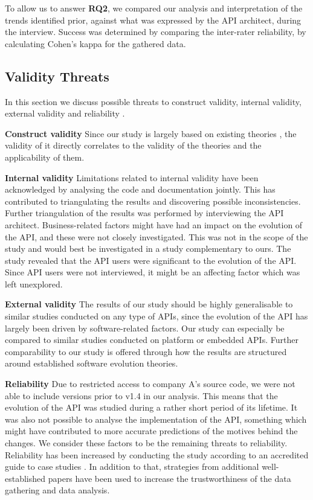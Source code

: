 \documentclass{sig-alternate}
\begin{document}
To allow us to answer \textbf{RQ2}, we compared our analysis and interpretation of the trends identified prior, against what was expressed by the API architect, during the interview. Success was determined by comparing the inter-rater reliability, by calculating Cohen's kappa \cite{cohen1968weighted} for the gathered data. 





\subsection{Validity Threats} \label{validity_threats} 
In this section we discuss possible threats to construct validity, internal validity, external validity and reliability \cite{runeson2009guidelines}.

\smallskip \noindent
\textbf{Construct validity  } Since our study is largely based on existing theories \cite{chapin2001types, lehman90sview}, the validity of it directly correlates to the validity of the theories and the applicability of them. 

\smallskip \noindent
\textbf{Internal validity  } Limitations related to internal validity have been acknowledged by analysing the code and documentation jointly. This has contributed to triangulating the results and discovering possible inconsistencies. Further triangulation of the results was performed by interviewing the API architect. Business-related factors might have had an impact on the evolution of the API, and these were not closely investigated. This was not in the scope of the study and would best be investigated in a study complementary to ours. The study revealed that the API users were significant to the evolution of the API. Since API users were not interviewed, it might be an affecting factor which was left unexplored. 

\smallskip \noindent
\textbf{External validity  } The results of our study should be highly generalisable to similar studies conducted on any type of APIs, since the evolution of the API has largely been driven by software-related factors. Our study can especially be compared to similar studies conducted on platform or embedded APIs. Further comparability to our study is offered through how the results are structured around established software evolution theories. 

\smallskip \noindent
\textbf{Reliability  } Due to restricted access to company A's source code, we were not able to include versions prior to v1.4 in our analysis. This means that the evolution of the API was studied during a rather short period of its lifetime. It was also not possible to analyse the implementation of the API, something which might have contributed to more accurate predictions of the motives behind the changes. We consider these factors to be the remaining threats to reliability. Reliability has been increased by conducting the study according to an accredited guide to case studies \cite{runeson2009guidelines}. In addition to that, strategies from additional well-established papers \cite{andersson2007spiral, robson2002real, seaman1999qualitative} have been used to increase the trustworthiness of the data gathering and data analysis. 
\end{document}
